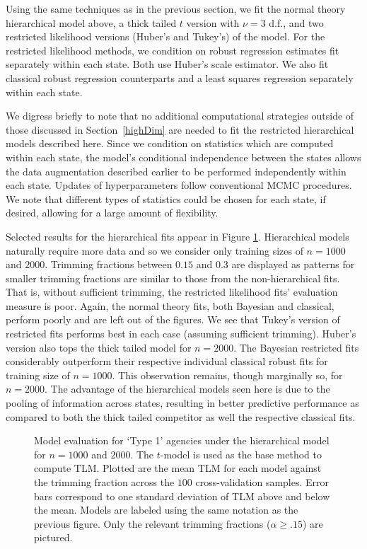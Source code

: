 \documentclass[12pt]{article}
\begin{document}
Using the same techniques as in the previous section, 
we fit the normal theory hierarchical model above, a thick tailed $t$ version with $\nu = 3$ d.f., and two restricted likelihood versions (Huber's and Tukey's) of the model.  For the restricted likelihood methods, we condition on robust regression estimates fit separately within each state. Both use Huber's scale estimator. We also fit classical robust regression counterparts and a least squares regression separately within each state.  

We digress briefly to note that no additional computational strategies outside of those discussed in Section~\ref{highDim} are needed to fit the restricted hierarchical models described here. Since we condition on statistics which are computed within each state, the model's conditional independence between the states allows the data augmentation described earlier to be performed independently within each state.  Updates of hyperparameters follow conventional MCMC procedures.  We note that different types of statistics could be chosen for each state, if desired, allowing for a large amount of flexibility.  

Selected results for the hierarchical fits appear in Figure \ref{fig:hierType1Marg}. Hierarchical models naturally require more data and so we consider only training sizes of $n=1000$ and $2000$. Trimming fractions between $0.15$ and $0.3$ are displayed as patterns for smaller trimming fractions are similar to those from the non-hierarchical fits. That is, without sufficient trimming, the restricted likelihood fits' evaluation measure is poor. Again, the normal theory fits, both Bayesian and classical, perform poorly and are left out of the figures.  We see that Tukey's version of restricted fits performs best in each case (assuming sufficient trimming). Huber's version also tops the thick tailed model for $n=2000$.  The Bayesian restricted fits considerably outperform their respective individual classical robust fits for training size of $n=1000$. This observation remains, though marginally so, for $n=2000$. The advantage of the hierarchical models seen here is due to the pooling of information across states, resulting in better predictive performance as compared to both the thick tailed competitor as well the respective classical fits.

\begin{figure}[t]
\quad
{}
\caption{Model evaluation for `Type 1' agencies under the hierarchical model for $n=1000$ and $2000$. The $t$-model is used as the base method to compute TLM. Plotted are the mean TLM for each model against the trimming fraction across the $100$ cross-validation samples. Error bars correspond to one standard deviation of TLM above and below the mean. Models are labeled using the same notation as the previous figure. Only the relevant trimming fractions ($\alpha\geq .15$) are pictured.  
}
\label{fig:hierType1Marg}
\end{figure}
\end{document}
